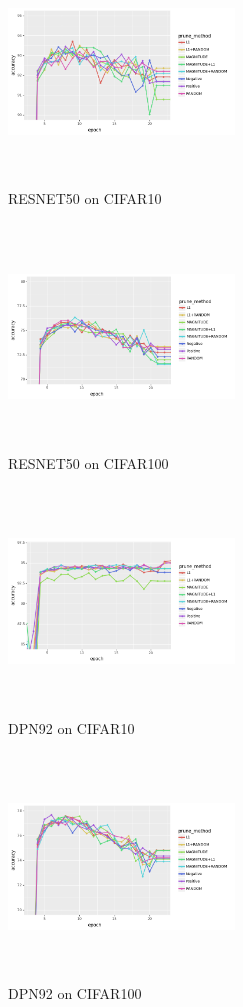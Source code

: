 \documentclass[11pt]{article}
\begin{document}
\begin{figure}[H]
\centering
\includegraphics[width=6cm, height=6cm]{Paper/images/resnet50cifar10.png}
\caption{RESNET50 on CIFAR10}
\end{figure}
\begin{figure}[H]
\centering
\includegraphics[width=6cm, height=6cm]{Paper/images/resnet50cifar100.png}
\caption{RESNET50 on CIFAR100}
\end{figure}
\begin{figure}[H]
\centering
\includegraphics[width=6cm, height=6cm]{Paper/images/dpn92cifar10.png}
\caption{DPN92 on CIFAR10}
\end{figure}
\begin{figure}[H]
\centering
\includegraphics[width=6cm, height=6cm]{Paper/images/dpn92cifar100.png}
\caption{DPN92 on CIFAR100}
\end{figure}
\end{document}
